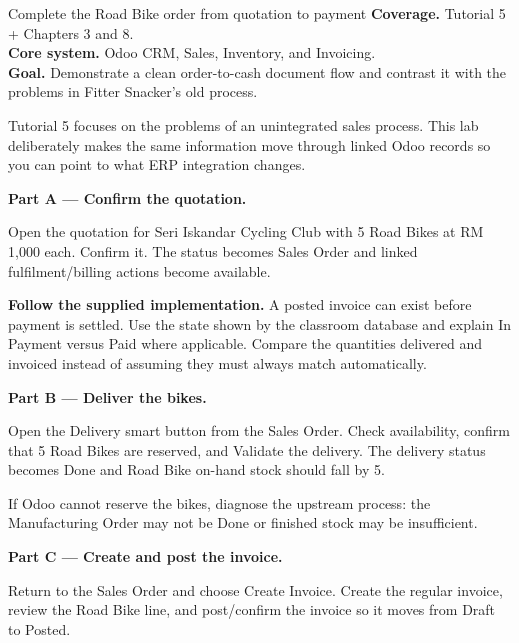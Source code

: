 
\begin{labproject}{Complete the Road Bike order from quotation to payment}
\textbf{Coverage.} Tutorial 5 + Chapters 3 and 8.\\
\textbf{Core system.} Odoo CRM, Sales, Inventory, and Invoicing.\\
\textbf{Goal.} Demonstrate a clean order-to-cash document flow and contrast it with the problems in Fitter Snacker's old process.




\begin{labmode}
Tutorial 5 focuses on the problems of an unintegrated sales process. This lab deliberately makes the same information move through linked Odoo records so you can point to what ERP integration changes.
\end{labmode}

\medskip\noindent\textbf{Part A --- Confirm the quotation.}

Open the quotation for Seri Iskandar Cycling Club with 5 Road Bikes at RM 1,000 each. Confirm it. The status becomes Sales Order and linked fulfilment/billing actions become available.




\textbf{Follow the supplied implementation.} A posted invoice can exist before payment is settled. Use the state shown by the classroom database and explain In Payment versus Paid where applicable. Compare the quantities delivered and invoiced instead of assuming they must always match automatically.


\medskip\noindent\textbf{Part B --- Deliver the bikes.}

Open the Delivery smart button from the Sales Order. Check availability, confirm that 5 Road Bikes are reserved, and Validate the delivery. The delivery status becomes Done and Road Bike on-hand stock should fall by 5.

If Odoo cannot reserve the bikes, diagnose the upstream process: the Manufacturing Order may not be Done or finished stock may be insufficient.

\medskip\noindent\textbf{Part C --- Create and post the invoice.}

Return to the Sales Order and choose Create Invoice. Create the regular invoice, review the Road Bike line, and post/confirm the invoice so it moves from Draft to Posted.


\end{labproject}
